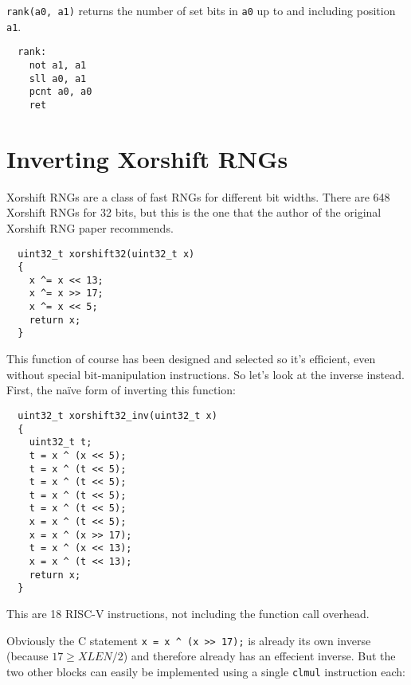 \texttt{rank(a0, a1)} returns the number of set bits in \texttt{a0} up to and
including position \texttt{a1}.

\begin{minipage}{\linewidth}
\begin{verbatim}
  rank:
    not a1, a1
    sll a0, a1
    pcnt a0, a0
    ret
\end{verbatim}
\end{minipage}


\section{Inverting Xorshift RNGs}

Xorshift RNGs are a class of fast RNGs for different bit widths. There are 648
Xorshift RNGs for 32 bits, but this is the one that the author of the original
Xorshift RNG paper recommends.~\cite[p. 4]{Xorshift}

\begin{minipage}{\linewidth}
\begin{verbatim}
  uint32_t xorshift32(uint32_t x)
  {
    x ^= x << 13;
    x ^= x >> 17;
    x ^= x << 5;
    return x;
  }
\end{verbatim}
\end{minipage}

This function of course has been designed and selected so it's efficient, even
without special bit-manipulation instructions. So let's look at the inverse
instead. First, the na\"ive form of inverting this function:

\begin{minipage}{\linewidth}
\begin{verbatim}
  uint32_t xorshift32_inv(uint32_t x)
  {
    uint32_t t;
    t = x ^ (x << 5);
    t = x ^ (t << 5);
    t = x ^ (t << 5);
    t = x ^ (t << 5);
    t = x ^ (t << 5);
    x = x ^ (t << 5);
    x = x ^ (x >> 17);
    t = x ^ (x << 13);
    x = x ^ (t << 13);
    return x;
  }
\end{verbatim}
\end{minipage}

This are 18 RISC-V instructions, not including the function call overhead.

Obviously the C statement {\tt x = x \^{} (x >> 17);} is already its own inverse
(because $17 \ge XLEN/2$) and therefore already has an effecient inverse. But the two
other blocks can easily be implemented using a single {\tt clmul} instruction each:

